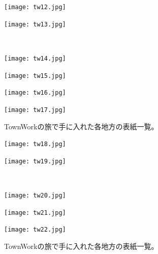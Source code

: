 \newpage
\begin{figure}[htbp]
    \centering
  \begin{minipage}{0.4\linewidth}
    \centering
    \texttt{[image: tw12.jpg]}
  \end{minipage}
  \begin{minipage}{0.4\linewidth}
    \centering
    \texttt{[image: tw13.jpg]}
  \end{minipage}\\
  \begin{minipage}{0.4\linewidth}
    \centering
    \texttt{[image: tw14.jpg]}
  \end{minipage}
  \begin{minipage}{0.4\linewidth}
    \centering
    \texttt{[image: tw15.jpg]}
  \end{minipage}
  \begin{minipage}{0.4\linewidth}
    \centering
    \texttt{[image: tw16.jpg]}
  \end{minipage}
  \begin{minipage}{0.4\linewidth}
    \centering
    \texttt{[image: tw17.jpg]}
  \end{minipage}
  \caption{TownWorkの旅で手に入れた各地方の表紙一覧。}
  \label{CscDetaDphi-CSide}
\end{figure}

\newpage
\begin{figure}[htbp]
    \centering
  \begin{minipage}{0.4\linewidth}
    \centering
    \texttt{[image: tw18.jpg]}
  \end{minipage}
  \begin{minipage}{0.4\linewidth}
    \centering
    \texttt{[image: tw19.jpg]}
  \end{minipage}\\
  \begin{minipage}{0.4\linewidth}
    \centering
    \texttt{[image: tw20.jpg]}
  \end{minipage}
  \begin{minipage}{0.4\linewidth}
    \centering
    \texttt{[image: tw21.jpg]}
  \end{minipage}
  \begin{minipage}{0.4\linewidth}
    \centering
    \texttt{[image: tw22.jpg]}
  \end{minipage}
  \caption{TownWorkの旅で手に入れた各地方の表紙一覧。}
  \label{CscDetaDphi-CSide}
\end{figure}

\newpage
\clearpage
\newpage
\clearpage

